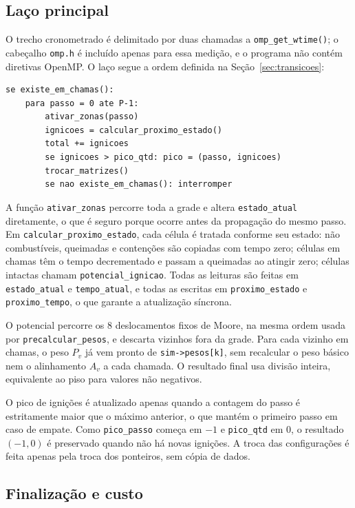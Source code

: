 \documentclass[12pt,a4paper]{article}
\begin{document}
\subsection{Laço principal}

O trecho cronometrado é delimitado por duas chamadas a
\texttt{omp\_get\_wtime()}; o cabeçalho \texttt{omp.h} é incluído
apenas para essa medição, e o programa não contém diretivas OpenMP.
O laço segue a ordem definida na Seção~\ref{sec:transicoes}:

\begin{lstlisting}
se existe_em_chamas():
    para passo = 0 ate P-1:
        ativar_zonas(passo)
        ignicoes = calcular_proximo_estado()
        total += ignicoes
        se ignicoes > pico_qtd: pico = (passo, ignicoes)
        trocar_matrizes()
        se nao existe_em_chamas(): interromper
\end{lstlisting}

A função \texttt{ativar\_zonas} percorre toda a grade e altera
\texttt{estado\_atual} diretamente, o que é seguro porque ocorre antes
da propagação do mesmo passo. Em \texttt{calcular\_proximo\_estado},
cada célula é tratada conforme seu estado: não combustíveis, queimadas e
contenções são copiadas com tempo zero; células em chamas têm o tempo
decrementado e passam a queimadas ao atingir zero; células intactas
chamam \texttt{potencial\_ignicao}. Todas as leituras são feitas em
\texttt{estado\_atual} e \texttt{tempo\_atual}, e todas as escritas em
\texttt{proximo\_estado} e \texttt{proximo\_tempo}, o que garante a
atualização síncrona.

O potencial percorre os 8 deslocamentos fixos de Moore, na mesma ordem
usada por \texttt{precalcular\_pesos}, e descarta vizinhos fora da
grade. Para cada vizinho em chamas, o peso $P_v$ já vem pronto de
\texttt{sim->pesos[k]}, sem recalcular o peso básico nem o alinhamento
$A_v$ a cada chamada. O resultado final usa divisão inteira, equivalente
ao piso para valores não negativos.

O pico de ignições é atualizado apenas quando a contagem do passo é
estritamente maior que o máximo anterior, o que mantém o primeiro passo
em caso de empate. Como \texttt{pico\_passo} começa em $-1$ e
\texttt{pico\_qtd} em $0$, o resultado $(-1,0)$ é preservado quando não
há novas ignições. A troca das configurações é feita apenas pela troca
dos ponteiros, sem cópia de dados.

\subsection{Finalização e custo}
\end{document}
